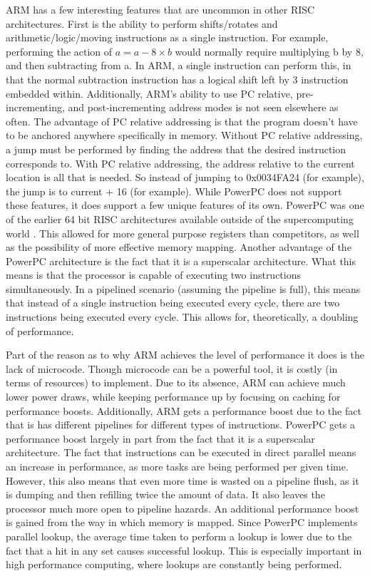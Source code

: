 \documentclass[letterpaper,10pt,onecolumn,titlepage]{article}
\begin{document}
\par
ARM has a few interesting features that are uncommon in other RISC architectures. First is
the ability to perform shifts/rotates and arithmetic/logic/moving instructions as a single
instruction. For example, performing the action of $a = a - 8 \times b$ would normally
require multiplying b by 8, and then subtracting from a. In ARM, a single instruction can
perform this, in that the normal subtraction instruction has a logical shift left by 3
instruction embedded within. Additionally, ARM's ability to use PC relative,
pre-incrementing, and post-incrementing address modes is not seen elsewhere as often. The
advantage of PC relative addressing is that the program doesn't have to be anchored
anywhere specifically in memory. Without PC relative addressing, a jump must be performed
by finding the address that the desired instruction corresponds to. With PC relative
addressing, the address relative to the current location is all that is needed. So instead
of jumping to 0x0034FA24 (for example), the jump is to current + 16 (for example). While
PowerPC does not support these features, it does support a few unique features of its own.
PowerPC was one of the earlier 64 bit RISC architectures available outside of the
supercomputing world \cite{Bishop}. This allowed for more general purpose registers than
competitors, as well as the possibility of more effective memory mapping. Another
advantage of the PowerPC architecture is the fact that it is a superscalar architecture.
What this means is that the processor is capable of executing two instructions
simultaneously. In a pipelined scenario (assuming the pipeline is full), this means that
instead of a single instruction being executed every cycle, there are two instructions
being executed every cycle. This allows for, theoretically, a doubling of performance.

\par
Part of the reason as to why ARM achieves the level of performance it does is the lack of
microcode. Though microcode can be a powerful tool, it is costly (in terms of resources)
to implement. Due to its absence, ARM can achieve much lower power draws, while keeping
performance up by focusing on caching for performance boosts. Additionally, ARM gets a
performance boost due to the fact that is has different pipelines for different types of
instructions. PowerPC gets a performance boost largely in part from the fact that it is a
superscalar architecture. The fact that instructions can be executed in direct parallel
means an increase in performance, as more tasks are being performed per given time.
However, this also means that even more time is wasted on a pipeline flush, as it is
dumping and then refilling twice the amount of data. It also leaves the processor much 
more open to pipeline hazards. An additional performance boost is gained from the way in
which memory is mapped. Since PowerPC implements parallel lookup, the average time taken
to perform a lookup is lower due to the fact that a hit in any set causes successful
lookup. This is especially important in high performance computing, where lookups are
constantly being performed.
\end{document}
